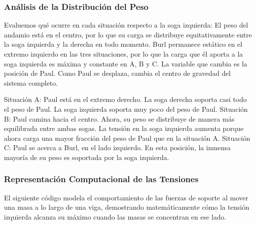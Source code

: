 \documentclass[12pt,letterpaper]{article}
\begin{document}
\subsubsection*{Análisis de la Distribución del Peso}
Evaluemos qué ocurre en cada situación respecto a la soga izquierda:
El peso del andamio está en el centro, por lo que su carga se distribuye equitativamente entre la soga izquierda y la derecha en todo momento.
Burl permanece estático en el extremo izquierdo en las tres situaciones, por lo que la carga que él aporta a la soga izquierda es máxima y constante en A, B y C.
La variable que cambia es la posición de Paul. Como Paul se desplaza, cambia el centro de gravedad del sistema completo.

Situación A: Paul está en el extremo derecho. La soga derecha soporta casi todo el peso de Paul. La soga izquierda soporta muy poco del peso de Paul.
Situación B: Paul camina hacia el centro. Ahora, su peso se distribuye de manera más equilibrada entre ambas sogas. La tensión en la soga izquierda aumenta porque ahora carga una mayor fracción del peso de Paul que en la situación A.
Situación C: Paul se acerca a Burl, en el lado izquierdo. En esta posición, la inmensa mayoría de su peso es soportada por la soga izquierda.

\subsubsection*{Representación Computacional de las Tensiones}
El siguiente código modela el comportamiento de las fuerzas de soporte al mover una masa a lo largo de una viga, demostrando matemáticamente cómo la tensión izquierda alcanza su máximo cuando las masas se concentran en ese lado.
\end{document}
